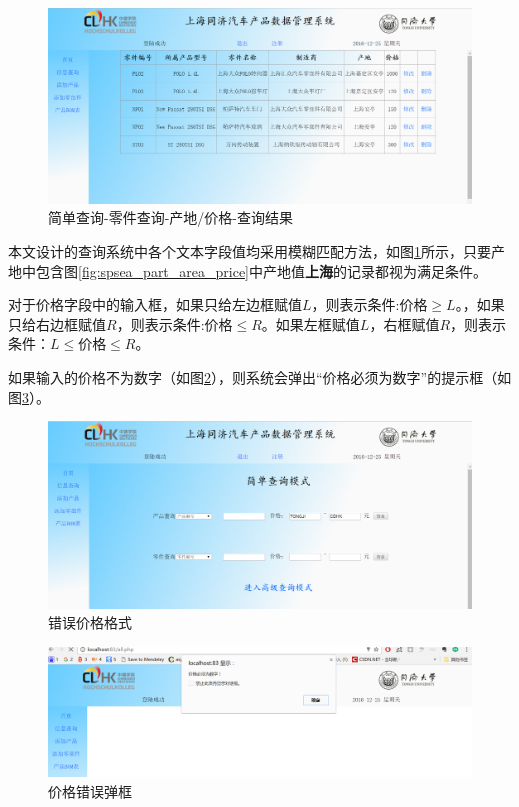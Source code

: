 \begin{figure}[H]
\centering
\includegraphics[width=0.9\linewidth]{figure/spsea_part_area_price_result}
\caption{简单查询-零件查询-产地/价格-查询结果}
\label{fig:spsea_part_area_price_result}
\end{figure}

本文设计的查询系统中各个文本字段值均采用模糊匹配方法，如图\ref{fig:spsea_part_area_price_result}所示，只要产地中包含图\ref{fig:spsea_part_area_price}中产地值\textbf{上海}的记录都视为满足条件。

对于价格字段中的输入框，如果只给左边框赋值$L$，则表示条件:价格$\ge L$。，如果只给右边框赋值$R$，则表示条件:价格$\le R$。如果左框赋值$L$，右框赋值$R$，则表示条件：$L \le$价格$\le R$。

如果输入的价格不为数字（如图\ref{fig:price_error}），则系统会弹出``价格必须为数字''的提示框（如图\ref{fig:price_error_alert}）。
\begin{figure}[H]
\centering
\includegraphics[width=0.9\linewidth]{figure/price_error}
\caption{错误价格格式}
\label{fig:price_error}
\end{figure}
\begin{figure}[H]
\centering
\includegraphics[width=0.9\linewidth]{figure/price_error_alert}
\caption{价格错误弹框}
\label{fig:price_error_alert}
\end{figure}

